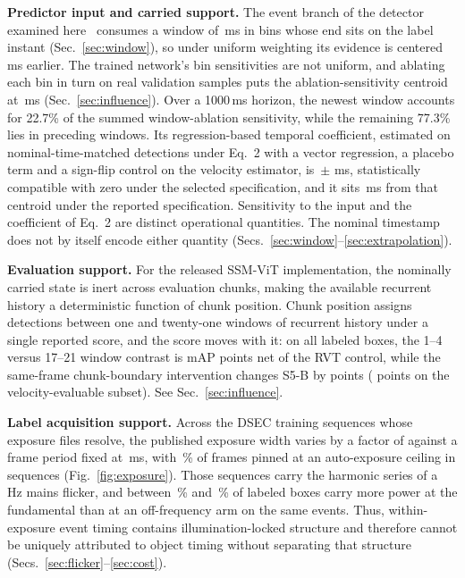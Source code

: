 \documentclass[10pt,twocolumn,letterpaper]{article}
\begin{document}
\textbf{Predictor input and carried support.} The event branch of the detector examined
here~\cite{gehrig2023rvt} consumes a window of \rvtWindow\,ms in \rvtBins{} bins whose end
sits on the label instant (Sec.~\ref{sec:window}), so under uniform weighting its evidence
is centered \rvtCentroidMag\,ms earlier. The trained network's bin sensitivities are not
uniform, and ablating each bin in turn on real validation samples puts the
ablation-sensitivity centroid at \rvtCentroidMeas\,ms (Sec.~\ref{sec:influence}).
Over a 1000\,ms horizon, the newest window accounts for 22.7\% of the summed
window-ablation sensitivity, while the remaining 77.3\% lies in preceding windows. Its
regression-based temporal coefficient, estimated on
nominal-time-matched detections under Eq.~2 with a vector regression, a placebo term and a
sign-flip control on the velocity estimator, is
\ladderFullTau\,$\pm$\,\ladderFullTauSE\,ms, statistically compatible with zero under the
selected specification, and it sits \outInterval\,ms from that centroid under
the reported specification. Sensitivity to the input and the coefficient of Eq.~2 are
distinct operational quantities. The nominal timestamp does not by itself encode either quantity
(Secs.~\ref{sec:window}--\ref{sec:extrapolation}).

\textbf{Evaluation support.} For the released SSM-ViT implementation, the nominally carried
state is inert across evaluation chunks, making the available recurrent history a deterministic
function of chunk position. Chunk position assigns detections between one and twenty-one windows
of recurrent history under a single reported score, and the score moves with it: on all labeled
boxes, the 1--4 versus 17--21 window contrast is \chunkDidBase{} mAP points net of the RVT
control, while the same-frame chunk-boundary intervention changes S5-B by
\ssmPairedMapAllBase{} points (\ssmPairedMapVelBase{} points on the velocity-evaluable subset).
See Sec.~\ref{sec:influence}.

\textbf{Label acquisition support.} Across the \dsecSeqCount{} DSEC training sequences whose
exposure files resolve, the published exposure width varies by a factor of \dsecExpRatio{}
against a frame period fixed at \dsecFramePeriod\,ms, with \dsecPinnedFrac\,\% of frames
pinned at an auto-exposure ceiling in \dsecCeilingSeqs{} sequences
(Fig.~\ref{fig:exposure}). Those sequences carry the harmonic series of a
\flickerLineHz\,Hz mains flicker, and between \sixLockedLoPct\,\% and \sixLockedHiPct\,\% of
labeled boxes carry more power at the fundamental than at an off-frequency arm on the same
events. Thus, within-exposure event timing contains illumination-locked structure and
therefore cannot be uniquely attributed to object timing without separating that structure
(Secs.~\ref{sec:flicker}--\ref{sec:cost}).
\end{document}

